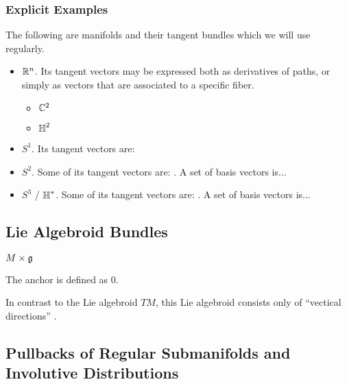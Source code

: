 \subsubsection{Explicit Examples}

The following are manifolds and their tangent bundles which we will use regularly.

    \begin{itemize}
    \item $\mathbb{R}^n$. Its tangent vectors may be expressed both as derivatives of paths, or simply as vectors that are associated to a specific fiber.
        \begin{itemize}
        \item $\mathbb{C}^2$
        \item $\operatorname{\mathbb{H}}^2$
        \end{itemize}
    \item $S^1$. Its tangent vectors are:
    \item $S^2$. Some of its tangent vectors are: . A set of basis vectors is...
    \item $S^3$ / $\operatorname{\mathbb{H}}^*$. Some of its tangent vectors are: . A set of basis vectors is...
    \end{itemize}

\subsection{Lie Algebroid Bundles}

\begin{definition}
$M \times \mathfrak{g}$
\end{definition}

The anchor is defined as $0$.

In contrast to the Lie algebroid $TM$, this Lie algebroid consists only of ``vectical directions'' .

\subsection{Pullbacks of Regular Submanifolds and Involutive Distributions}

